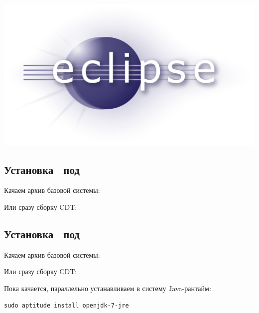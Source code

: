 \chapter{\eclipse}\label{eclipse}

\includegraphics[height=0.5\textheight]{logo/eclipse.png}

\section{Установка \eclipse\ под \win}


Качаем архив базовой системы:

Или сразу сборку CDT\eclipse:

\section{Установка \eclipse\ под \linux}


Качаем архив базовой системы:

Или сразу сборку CDT\eclipse:

\bigskip

Пока качается, параллельно устанавливаем в систему Java-рантайм:

\begin{verbatim}
sudo aptitude install openjdk-7-jre
\end{verbatim}


